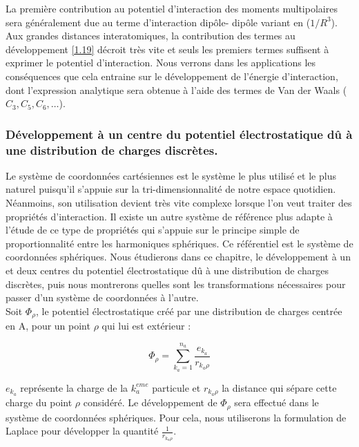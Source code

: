 	La première contribution au potentiel d'interaction des moments multipolaires sera généralement due au terme d'interaction dipôle- dipôle variant en ($1/R^{3}$). Aux grandes distances interatomiques, la contribution des termes au développement \ref{1.19} décroit très vite et seuls les premiers termes suffisent à exprimer le potentiel d'interaction. Nous verrons dans les applications les conséquences que cela entraine sur le développement de l'énergie d'interaction, dont l'expression analytique sera obtenue à l'aide des termes de Van der Waals ($C_{3}, C_{5}, C_{6}, \ldots$).\\
	
	
	\subsubsection{Développement à un centre du potentiel électrostatique dû à une distribution de charges discrètes.}
	
	Le système de coordonnées cartésiennes est le système le plus utilisé et le plus naturel puisqu'il s'appuie sur la tri-dimensionnalité de notre espace quotidien. Néanmoins, son utilisation devient très vite complexe lorsque l'on veut traiter des propriétés d'interaction. Il existe un autre système de référence plus adapte à l'étude de ce type de propriétés qui s'appuie sur le principe simple de proportionnalité entre les harmoniques sphériques. Ce référentiel est le système de coordonnées sphériques. Nous étudierons dans ce chapitre, le développement à un et deux centres du potentiel électrostatique dû à une distribution de charges discrètes, puis nous montrerons quelles sont les transformations nécessaires pour passer d'un système de coordonnées à l'autre.\\
	
	Soit $\Phi_{\rho}$, le potentiel électrostatique créé par une distribution de charges centrée en A, pour un point $\rho$ qui lui est extérieur : 
	
	\begin{equation}
	\Phi_{\rho} = \sum_{k_{a}=1}^{n_{a}} \frac{e_{k_{a}}}{r_{k_{a}\rho}} \label{1.20}
	\end{equation}
	
	$e_{k_{a}}$ représente la charge de la $k_{a}^{eme}$ particule et $r_{k_{a}\rho}$ la distance qui sépare cette charge du point $\rho$ considéré. Le développement de $\Phi_{\rho}$ sera effectué dans le système de coordonnées sphériques. Pour cela, nous utiliserons la formulation de Laplace pour développer la quantité $\frac{1}{r_{k_{a}\rho}}$.
	
